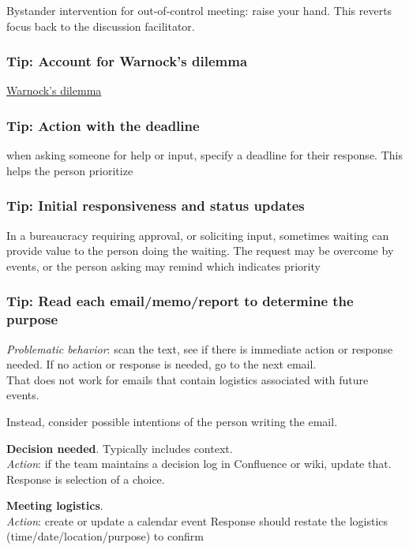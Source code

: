 Bystander intervention for out-of-control meeting: raise your hand. This reverts focus back to the discussion facilitator. 

\subsubsection{Tip: Account for Warnock's dilemma}
\href{https://en.wikipedia.org/wiki/Warnock\%27s_dilemma}{Warnock's dilemma}

\subsubsection{Tip: Action with the deadline}

when asking someone for help or input, specify a deadline for their response. This helps the person prioritize


\subsubsection{Tip: Initial responsiveness and status updates}
In a bureaucracy requiring approval, or soliciting input, sometimes waiting can provide value to the person doing the waiting. The request may be overcome by events, or the person asking may remind which indicates priority

\subsubsection{Tip: Read each email/memo/report to determine the purpose }

\textit{Problematic behavior}: scan the text, see if there is immediate action or response needed. If no action or response is needed, go to the next email. \\
 That does not work for emails that contain logistics associated with future events. 

Instead, consider possible intentions of the person writing the email. 

\textbf{Decision needed}.  Typically includes context. \\
\textit{Action}: if the team maintains a decision log in Confluence or wiki, update that.
Response is selection of a choice.

\textbf{Meeting logistics}.\\
\textit{Action}: create or update a calendar event
Response should restate the logistics (time/date/location/purpose) to confirm

